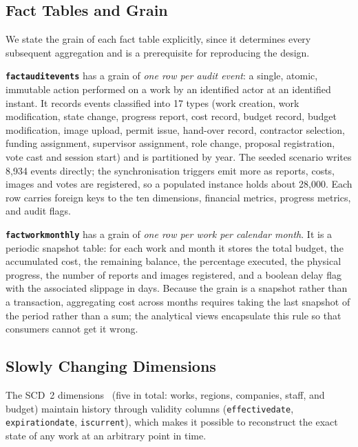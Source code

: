 \documentclass[runningheads]{llncs}
\renewcommand{\_}{\origunderscore\allowbreak}
\begin{document}
\subsection{Fact Tables and Grain}
\label{sec:grano}

We state the grain of each fact table explicitly, since it determines every subsequent aggregation and is a prerequisite for reproducing the design.

\textbf{\texttt{fact\_audit\_events}} has a grain of \emph{one row per audit event}: a single, atomic, immutable action performed on a work by an identified actor at an identified instant. It records events classified into 17 types (work creation, work modification, state change, progress report, cost record, budget record, budget modification, image upload, permit issue, hand-over record, contractor selection, funding assignment, supervisor assignment, role change, proposal registration, vote cast and session start) and is partitioned by year. The seeded scenario writes 8,934 events directly; the synchronisation triggers emit more as reports, costs, images and votes are registered, so a populated instance holds about 28,000. Each row carries foreign keys to the ten dimensions, financial metrics, progress metrics, and audit flags.

\textbf{\texttt{fact\_work\_monthly}} has a grain of \emph{one row per work per calendar month}. It is a periodic snapshot table: for each work and month it stores the total budget, the accumulated cost, the remaining balance, the percentage executed, the physical progress, the number of reports and images registered, and a boolean delay flag with the associated slippage in days. Because the grain is a snapshot rather than a transaction, aggregating cost across months requires taking the last snapshot of the period rather than a sum; the analytical views encapsulate this rule so that consumers cannot get it wrong.

\subsection{Slowly Changing Dimensions}
\label{sec:scd}

The SCD~2 dimensions~\cite{Kimball2013} (five in total: works, regions, companies, staff, and budget) maintain history through validity columns (\texttt{effective\_date}, \texttt{expiration\_date}, \texttt{is\_current}), which makes it possible to reconstruct the exact state of any work at an arbitrary point in time.
\end{document}
